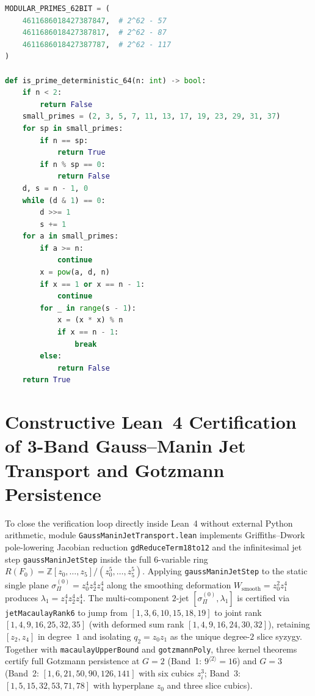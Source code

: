 \documentclass[11pt,a4paper]{article}
\begin{document}
\begin{lstlisting}[language=Python,caption={Deterministic $64$-bit primality test and $62$-bit CRT prime suite in \texttt{toolkit/modular\_crt\_linear\_solver.py}.}]
MODULAR_PRIMES_62BIT = (
    4611686018427387847,  # 2^62 - 57
    4611686018427387817,  # 2^62 - 87
    4611686018427387787,  # 2^62 - 117
)

def is_prime_deterministic_64(n: int) -> bool:
    if n < 2:
        return False
    small_primes = (2, 3, 5, 7, 11, 13, 17, 19, 23, 29, 31, 37)
    for sp in small_primes:
        if n == sp:
            return True
        if n % sp == 0:
            return False
    d, s = n - 1, 0
    while (d & 1) == 0:
        d >>= 1
        s += 1
    for a in small_primes:
        if a >= n:
            continue
        x = pow(a, d, n)
        if x == 1 or x == n - 1:
            continue
        for _ in range(s - 1):
            x = (x * x) % n
            if x == n - 1:
                break
        else:
            return False
    return True
\end{lstlisting}

\section{Constructive Lean~4 Certification of 3-Band Gauss--Manin Jet Transport and Gotzmann Persistence}

To close the verification loop directly inside Lean~4 without external Python arithmetic, module \texttt{GaussManinJetTransport.lean} implements Griffiths--Dwork pole-lowering Jacobian reduction \texttt{gdReduceTerm18to12} and the infinitesimal jet step \texttt{gaussManinJetStep} inside the full $6$-variable ring $R(F_0) = \mathbb{Z}[z_0,\dots,z_5]/(z_0^5,\dots,z_5^5)$. Applying \texttt{gaussManinJetStep} to the static single plane $\sigma_\Pi^{(0)} = z_0^4 z_2^4 z_4^4$ along the smoothing deformation $W_{\mathrm{smooth}} = z_0^2 z_1^4$ produces $\lambda_1 = z_1^4 z_2^4 z_4^4$. The multi-component $2$-jet $[\sigma_\Pi^{(0)}, \lambda_1]$ is certified via \texttt{jetMacaulayRank6} to jump from $[1, 3, 6, 10, 15, 18, 19]$ to joint rank $[1, 4, 9, 16, 25, 32, 35]$ (with deformed sum rank $[1, 4, 9, 16, 24, 30, 32]$), retaining $[z_2, z_4]$ in degree~$1$ and isolating $q_2 = z_0 z_1$ as the unique degree-$2$ slice syzygy. Together with \texttt{macaulayUpperBound} and \texttt{gotzmannPoly}, three kernel theorems certify full Gotzmann persistence at $G=2$ (Band~1: $9^{\langle 2 \rangle} = 16$) and $G=3$ (Band~2: $[1, 6, 21, 50, 90, 126, 141]$ with six cubics $z_i^3$; Band~3: $[1, 5, 15, 32, 53, 71, 78]$ with hyperplane $z_0$ and three slice cubics).
\end{document}
